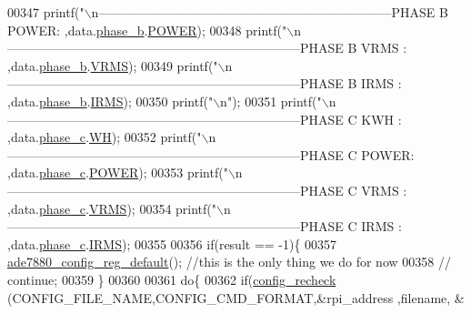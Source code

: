 \begin{DoxyCode}
{{{{{00347         printf(\textcolor{stringliteral}{"\(\backslash\)n---------------------------------------------------------------------PHASE B POWER: %
      ,data.\hyperlink{a00028_a48734adeb4d59d056b6e39c6e08fe21e}{phase\_b}.\hyperlink{a00029_a8a9794fa4c6a69b457d1eb04b017ef1e}{POWER});
00348         printf(\textcolor{stringliteral}{"\(\backslash\)n---------------------------------------------------------------------PHASE B VRMS : %
      ,data.\hyperlink{a00028_a48734adeb4d59d056b6e39c6e08fe21e}{phase\_b}.\hyperlink{a00029_a08415029e214174a01bc6487ff98ee9b}{VRMS});
00349         printf(\textcolor{stringliteral}{"\(\backslash\)n---------------------------------------------------------------------PHASE B IRMS : %
      ,data.\hyperlink{a00028_a48734adeb4d59d056b6e39c6e08fe21e}{phase\_b}.\hyperlink{a00029_a4f87f30b543e89e2e5dfa1b8f3f58eff}{IRMS});
00350         printf(\textcolor{stringliteral}{"\(\backslash\)n"});
00351         printf(\textcolor{stringliteral}{"\(\backslash\)n---------------------------------------------------------------------PHASE C KWH  : %
      ,data.\hyperlink{a00028_ad8892f27909cf51f7603adfc00d224df}{phase\_c}.\hyperlink{a00029_a8dd6d8406db4e214238b3eff481e4ea0}{WH});
00352         printf(\textcolor{stringliteral}{"\(\backslash\)n---------------------------------------------------------------------PHASE C POWER: %
      ,data.\hyperlink{a00028_ad8892f27909cf51f7603adfc00d224df}{phase\_c}.\hyperlink{a00029_a8a9794fa4c6a69b457d1eb04b017ef1e}{POWER});
00353         printf(\textcolor{stringliteral}{"\(\backslash\)n---------------------------------------------------------------------PHASE C VRMS : %
      ,data.\hyperlink{a00028_ad8892f27909cf51f7603adfc00d224df}{phase\_c}.\hyperlink{a00029_a08415029e214174a01bc6487ff98ee9b}{VRMS});
00354         printf(\textcolor{stringliteral}{"\(\backslash\)n---------------------------------------------------------------------PHASE C IRMS : %
      ,data.\hyperlink{a00028_ad8892f27909cf51f7603adfc00d224df}{phase\_c}.\hyperlink{a00029_a4f87f30b543e89e2e5dfa1b8f3f58eff}{IRMS});
00355                      
00356         \textcolor{keywordflow}{if}(result == -1)\{            
00357             \hyperlink{a00004_ga7782772c18e6ea515dcd28dcaedd0f06}{ade7880\_config\_reg\_default}(); \textcolor{comment}{//this is the only thing we do for now}
00358         \textcolor{comment}{//  continue;}
00359         \}
00360         
00361         \textcolor{keywordflow}{do}\{
00362         \textcolor{keywordflow}{if}(\hyperlink{a00002_gac93e16d1e9d6a04b52373bf3428cc79c}{config\_recheck} (CONFIG\_FILE\_NAME,CONFIG\_CMD\_FORMAT,&rpi\_address ,filename, &
}}}}}}}}}}}}
\end{DoxyCode}
